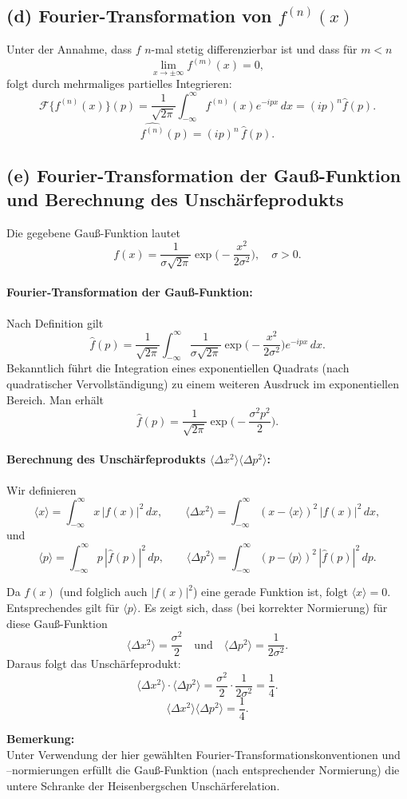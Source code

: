 \documentclass[a4paper,12pt]{article}
\begin{document}
\subsection*{(d) Fourier-Transformation von \( f^{(n)}(x) \)}

Unter der Annahme, dass \( f \) \( n \)-mal stetig differenzierbar ist und dass für \( m<n \)
\[
\lim_{x\to\pm\infty}f^{(m)}(x)=0,
\]
folgt durch mehrmaliges partielles Integrieren:
\[
\mathcal{F}\{f^{(n)}(x)\}(p)=\frac{1}{\sqrt{2\pi}}\int_{-\infty}^{\infty} f^{(n)}(x)e^{-ipx}\,dx = (ip)^n\hat{f}(p).
\]
\[
\boxed{\widehat{f^{(n)}}(p)=(ip)^n\,\hat{f}(p).}
\]

\subsection*{(e) Fourier-Transformation der Gauß-Funktion und Berechnung des Unschärfeprodukts}

Die gegebene Gauß-Funktion lautet
\[
f(x)=\frac{1}{\sigma\sqrt{2\pi}}\exp\!\Biggl(-\frac{x^2}{2\sigma^2}\Biggr),\quad \sigma>0.
\]

\paragraph{Fourier-Transformation der Gauß-Funktion:}

Nach Definition gilt
\[
\hat{f}(p)=\frac{1}{\sqrt{2\pi}}\int_{-\infty}^{\infty} \frac{1}{\sigma\sqrt{2\pi}}\exp\!\Biggl(-\frac{x^2}{2\sigma^2}\Biggr)e^{-ipx}\,dx.
\]
Bekanntlich führt die Integration eines exponentiellen Quadrats (nach quadratischer Vervollständigung) zu einem weiteren Ausdruck im exponentiellen Bereich. Man erhält
\[
\boxed{\hat{f}(p)=\frac{1}{\sqrt{2\pi}}\exp\!\Biggl(-\frac{\sigma^2p^2}{2}\Biggr).}
\]

\paragraph{Berechnung des Unschärfeprodukts \(\langle \Delta x^2\rangle\langle \Delta p^2\rangle\):}

Wir definieren
\[
\langle x\rangle = \int_{-\infty}^{\infty} x\,|f(x)|^2\,dx,\qquad
\langle \Delta x^2\rangle = \int_{-\infty}^{\infty} (x-\langle x\rangle)^2\,|f(x)|^2\,dx,
\]
und
\[
\langle p\rangle = \int_{-\infty}^{\infty} p\,|\hat{f}(p)|^2\,dp,\qquad
\langle \Delta p^2\rangle = \int_{-\infty}^{\infty} (p-\langle p\rangle)^2\,|\hat{f}(p)|^2\,dp.
\]

Da \( f(x) \) (und folglich auch \( |f(x)|^2 \)) eine gerade Funktion ist, folgt \( \langle x\rangle = 0 \). Entsprechendes gilt für \( \langle p\rangle \). Es zeigt sich, dass (bei korrekter Normierung) für diese Gauß-Funktion
\[
\langle \Delta x^2\rangle = \frac{\sigma^2}{2} \quad \text{und} \quad \langle \Delta p^2\rangle = \frac{1}{2\sigma^2}.
\]
Daraus folgt das Unschärfeprodukt:
\[
\langle \Delta x^2\rangle \cdot \langle \Delta p^2\rangle = \frac{\sigma^2}{2}\cdot\frac{1}{2\sigma^2} = \frac{1}{4}.
\]
\[
\boxed{\langle \Delta x^2\rangle \langle \Delta p^2\rangle = \frac{1}{4}.}
\]

\medskip

\textbf{Bemerkung:}\\
Unter Verwendung der hier gewählten Fourier-Transformationskonventionen und –normierungen erfüllt die Gauß-Funktion (nach entsprechender Normierung) die untere Schranke der Heisenbergschen Unschärferelation.
\end{document}
